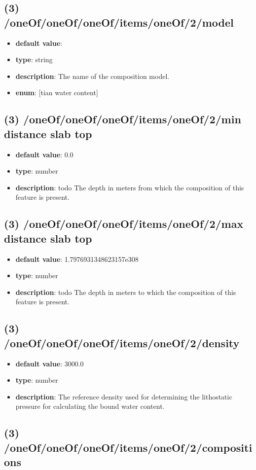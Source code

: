 \subsection{(3) /oneOf/oneOf/oneOf/items/oneOf/2/model}
\begin{itemize}[leftmargin=3em]\item {\bf default value}: 
\item {\bf type}: string
\item {\bf description}: The name of the composition model.
\item {\bf enum}: [tian water content]\end{itemize}\subsection{(3) /oneOf/oneOf/oneOf/items/oneOf/2/min distance slab top}
\begin{itemize}[leftmargin=3em]\item {\bf default value}: 0.0
\item {\bf type}: number
\item {\bf description}: todo The depth in meters from which the composition of this feature is present.
\end{itemize}\subsection{(3) /oneOf/oneOf/oneOf/items/oneOf/2/max distance slab top}
\begin{itemize}[leftmargin=3em]\item {\bf default value}: 1.7976931348623157e308
\item {\bf type}: number
\item {\bf description}: todo The depth in meters to which the composition of this feature is present.
\end{itemize}\subsection{(3) /oneOf/oneOf/oneOf/items/oneOf/2/density}
\begin{itemize}[leftmargin=3em]\item {\bf default value}: 3000.0
\item {\bf type}: number
\item {\bf description}: The reference density used for determining the lithostatic pressure for calculating the bound water content.
\end{itemize}\subsection{(3) /oneOf/oneOf/oneOf/items/oneOf/2/compositions}
